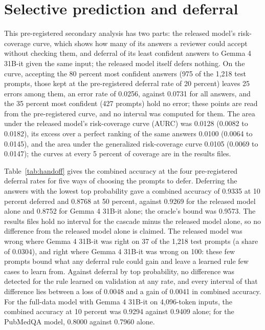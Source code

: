 \documentclass[11pt,letterpaper]{article}
\begin{document}
\begin{table}[t]
\centering\footnotesize
\caption{The cost of license filtering: each model minus the full-data model on Evidence Inference 2.0's test split (1,218 prompts in 333 articles), with 95 percent intervals from 1,000 article resamples. Each is calibrated on validation: the models fine-tuned on permissively licensed articles on the 654 permissively licensed validation prompts, the full-data model on all 1,237. ECE is the expected calibration error. \textsuperscript{\dag}No difference was detected: the interval includes zero.}
\label{tab:k2}
\setlength{\tabcolsep}{3.5pt}

\end{table}

\section{Selective prediction and deferral}
\label{sec:handoff}

This pre-registered secondary analysis has two parts: the released model's risk-coverage curve, which shows how many of its answers a reviewer could accept without checking them, and deferral of its least confident answers to Gemma 4 31B-it given the same input; the released model itself defers nothing. On the curve, accepting the 80 percent most confident answers (975 of the 1,218 test prompts, those kept at the pre-registered deferral rate of 20 percent) leaves 25 errors among them, an error rate of 0.0256, against 0.0731 for all answers, and the 35 percent most confident (427 prompts) hold no error; these points are read from the pre-registered curve, and no interval was computed for them. The area under the released model's risk-coverage curve (AURC) was 0.0128 (0.0082 to 0.0182), its excess over a perfect ranking of the same answers 0.0100 (0.0064 to 0.0145), and the area under the generalized risk-coverage curve 0.0105 (0.0069 to 0.0147); the curves at every 5 percent of coverage are in the results files.

Table~\ref{tab:handoff} gives the combined accuracy at the four pre-registered deferral rates for five ways of choosing the prompts to defer. Deferring the answers with the lowest top probability gave a combined accuracy of 0.9335 at 10 percent deferred and 0.8768 at 50 percent, against 0.9269 for the released model alone and 0.8752 for Gemma 4 31B-it alone; the oracle's bound was 0.9573. The results files hold no interval for the cascade minus the released model alone, so no difference from the released model alone is claimed. The released model was wrong where Gemma 4 31B-it was right on 37 of the 1,218 test prompts (a share of 0.0304), and right where Gemma 4 31B-it was wrong on 100: these few prompts bound what any deferral rule could gain and leave a learned rule few cases to learn from. Against deferral by top probability, no difference was detected for the rule learned on validation at any rate, and every interval of that difference lies between a loss of 0.0048 and a gain of 0.0041 in combined accuracy. For the full-data model with Gemma 4 31B-it on 4,096-token inputs, the combined accuracy at 10 percent was 0.9294 against 0.9409 alone; for the PubMedQA model, 0.8000 against 0.7960 alone.
\end{document}
